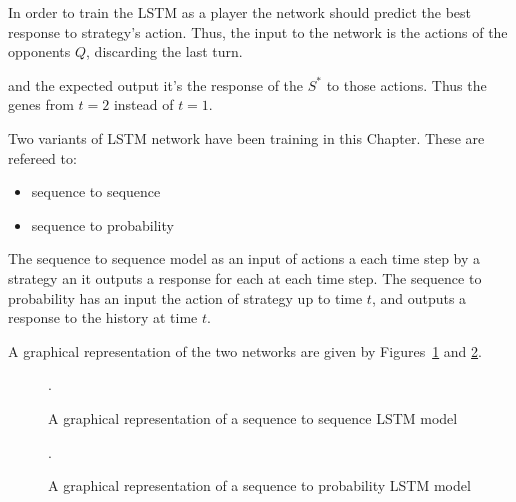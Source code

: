 In order to train the LSTM as a player the network should predict the best
response to strategy's action. Thus, the input to the network is the actions of
the opponents \(Q\), discarding the last turn.

\begin{figure}[!htbp]
    \centering
    
\end{figure}

and the expected output it's the response of the \(S^*\) to those actions.
Thus the genes from \(t=2\) instead of \(t=1\).

\begin{figure}[!htbp]
    \centering
    
\end{figure}

Two variants of LSTM network have been training in this Chapter. These are refereed to:

\begin{itemize}
    \item sequence to sequence
    \item sequence to probability
\end{itemize}

The sequence to sequence model as an input of actions a each time step by a strategy
an it outputs a response for each at each time step. The sequence to probability
has an input the action of strategy up to time \(t\), and outputs a response
to the history at time \(t\).

A graphical representation of the two networks are given by Figures~\ref{fig:sequence_to_sequence} and
\ref{fig:sequence_to_probability}.

\begin{figure}[!htbp]
    \centering
    
    \caption{A graphical representation of a sequence to sequence LSTM model}.\label{fig:sequence_to_sequence}
\end{figure}

\begin{figure}[!htbp]
    \centering
    
    \caption{A graphical representation of a sequence to probability LSTM model}.\label{fig:sequence_to_probability}
\end{figure}

